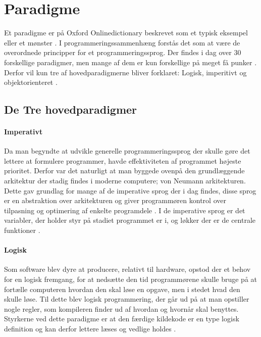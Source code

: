 \section{Paradigme}\label{sec:paradigmer}

Et paradigme er på Oxford Onlinedictionary beskrevet som et typisk eksempel eller et mønster \cite{Oxford_????}. I programmeringssammenhæng forstås det som at være de overordnede principper for et programmeringssprog. Der findes i dag over 30 forskellige paradigmer, men mange af dem er kun forskellige på meget få punker \cite{Roy_2009}. Derfor vil kun tre af hovedparadigmerne bliver forklaret: Logisk, imperitivt og objektorienteret \cite{Normark_2003}.

\subsection{De Tre hovedparadigmer}\label{ssec:hovedparadigmer}
\paragraph{Imperativt}
Da man begyndte at udvikle generelle programmeringssprog der skulle gøre det lettere at formulere programmer, havde effektiviteten af programmet højeste prioritet. Derfor var det naturligt at man byggede ovenpå den grundlæggende arkitektur der stadig findes i moderne computere; von Neumann arkitekturen. Dette gav grundlag for mange af de imperative sprog der i dag findes, disse sprog er en abstraktion over arkitekturen og giver programmøren kontrol over tilpasning og optimering af enkelte programdele \cite[38-39]{Sebesta_2013}. I de imperative sprog er det variabler, der holder styr på stadiet programmet er i, og løkker der er de centrale funktioner \cite{Sebesta_2013}.

\paragraph{Logisk}
Som software blev dyre at producere, relativt til hardware, opstod der et behov for en logisk fremgang, for at nedsætte den tid programmørene skulle bruge på at fortælle computeren hvordan den skal løse en opgave, men i stedet hvad den skulle løse. Til dette blev logisk programmering, der går ud på at man opstiller nogle regler, som kompileren finder ud af hvordan og hvornår skal benyttes. Styrkerne ved dette paradigme er at den færdige kildekode er en type logisk definition og kan derfor lettere læses og vedlige holdes \cite[kapitel 16]{Sebesta_2013}.

